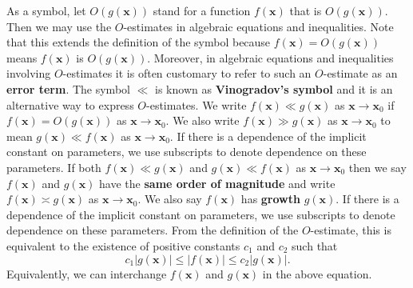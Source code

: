       As a symbol, let $O(g(\mathbf{x}))$ stand for a function $f(\mathbf{x})$ that is $O(g(\mathbf{x}))$. Then we may use the $O$-estimates in algebraic equations and inequalities. Note that this extends the definition of the symbol because $f(\mathbf{x}) = O(g(\mathbf{x}))$ means $f(\mathbf{x})$ is $O(g(\mathbf{x}))$. Moreover, in algebraic equations and inequalities involving $O$-estimates it is often customary to refer to such an $O$-estimate as an \textbf{error term}. The symbol $\ll$ is known as \textbf{Vinogradov's symbol} and it is an alternative way to express $O$-estimates. We write $f(\mathbf{x}) \ll g(\mathbf{x})$ as $\mathbf{x} \to \mathbf{x}_{0}$ if $f(\mathbf{x}) = O(g(\mathbf{x}))$ as $\mathbf{x} \to \mathbf{x}_{0}$. We also write $f(\mathbf{x}) \gg g(\mathbf{x})$ as $\mathbf{x} \to \mathbf{x}_{0}$ to mean $g(\mathbf{x}) \ll f(\mathbf{x})$ as $\mathbf{x} \to \mathbf{x}_{0}$. If there is a dependence of the implicit constant on parameters, we use subscripts to denote dependence on these parameters. If both $f(\mathbf{x}) \ll g(\mathbf{x})$ and $g(\mathbf{x}) \ll f(\mathbf{x})$ as $\mathbf{x} \to \mathbf{x}_{0}$ then we say $f(\mathbf{x})$ and $g(\mathbf{x})$ have the \textbf{same order of magnitude} and write $f(\mathbf{x}) \asymp g(\mathbf{x})$ as $\mathbf{x} \to \mathbf{x}_{0}$. We also say $f(\mathbf{x})$ has \textbf{growth} $g(\mathbf{x})$. If there is a dependence of the implicit constant on parameters, we use subscripts to denote dependence on these parameters. From the definition of the $O$-estimate, this is equivalent to the existence of positive constants $c_{1}$ and $c_{2}$ such that
      \[
        c_{1}|g(\mathbf{x})| \le |f(\mathbf{x})| \le c_{2}|g(\mathbf{x})|.
      \]
      Equivalently, we can interchange $f(\mathbf{x})$ and $g(\mathbf{x})$ in the above equation.
